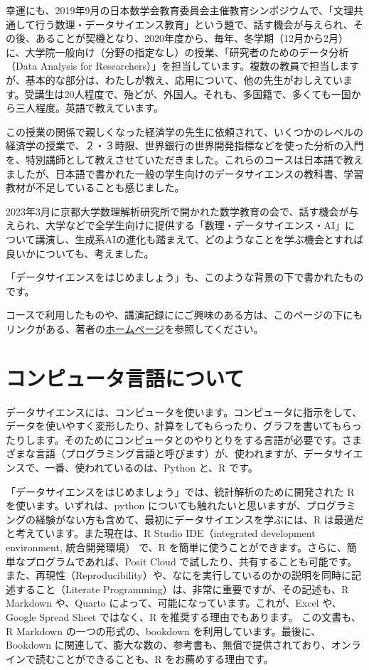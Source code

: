 \documentclass[
  xelatex, ja=standard]{bxjsbook}
\theoremstyle{definition}
\theoremstyle{definition}
\theoremstyle{definition}
\theoremstyle{definition}
\theoremstyle{remark}
\begin{document}
幸運にも、2019年9月の日本数学会教育委員会主催教育シンポジウムで、「文理共通して行う数理・データサイエンス教育」という題で、話す機会が与えられ、その後、あることが契機となり、2020年度から、毎年、冬学期（12月から2月）に、大学院一般向け（分野の指定なし）の授業、「研究者のためのデータ分析（Data Analysis for Researchers）」を担当しています。複数の教員で担当しますが、基本的な部分は、わたしが教え、応用について、他の先生がおしえています。受講生は20人程度で、殆どが、外国人。それも、多国籍で、多くても一国から三人程度。英語で教えています。

この授業の関係で親しくなった経済学の先生に依頼されて、いくつかのレベルの経済学の授業で、２・３時限、世界銀行の世界開発指標などを使った分析の入門を、特別講師として教えさせていただきました。これらのコースは日本語で教えましたが、日本語で書かれた一般の学生向けのデータサイエンスの教科書、学習教材が不足していることも感じました。

2023年3月に京都大学数理解析研究所で開かれた数学教育の会で、話す機会が与えられ、大学などで全学生向けに提供する「数理・データサイエンス・AI」について講演し、生成系AIの進化も踏まえて、どのようなことを学ぶ機会とすれば良いかについても、考えました。

「データサイエンスをはじめましょう」も、このような背景の下で書かれたものです。

コースで利用したものや、講演記録ににご興味のある方は、このページの下にもリンクがある、著者の\href{https://icu-hsuzuki.github.io/science/computer/learning/ds.html}{ホームページ}を参照してください。

\hypertarget{ux30b3ux30f3ux30d4ux30e5ux30fcux30bfux8a00ux8a9eux306bux3064ux3044ux3066}{%
\section*{コンピュータ言語について}\label{ux30b3ux30f3ux30d4ux30e5ux30fcux30bfux8a00ux8a9eux306bux3064ux3044ux3066}}

データサイエンスには、コンピュータを使います。コンピュータに指示をして、データを使いやすく変形したり、計算をしてもらったり、グラフを書いてもらったりします。そのためにコンピュータとのやりとりをする言語が必要です。さまざまな言語（プログラミング言語と呼びます）が、使われますが、データサイエンスで、一番、使われているのは、Python と、R です。

「データサイエンスをはじめましょう」では、統計解析のために開発された R を使います。いずれは、python についても触れたいと思いますが、プログラミングの経験がない方も含めて、最初にデータサイエンスを学ぶには、R は最適だと考えています。また現在は、R Studio IDE（integrated development environment, 統合開発環境） で、R を簡単に使うことができます。さらに、簡単なプログラムであれば、Posit Cloud で試したり、共有することも可能です。また、再現性（Reproducibility）や、なにを実行しているのかの説明を同時に記述すること（Literate Programming）は、非常に重要ですが、その記述も、R Markdown や、Quarto によって、可能になっています。これが、Excel や、Google Spread Sheet ではなく、R を推奨する理由でもあります。 この文書も、R Markdown の一つの形式の、bookdown を利用しています。最後に、Bookdown に関連して、膨大な数の、参考書も、無償で提供されており、オンラインで読むことができることも、R をお薦めする理由です。
\end{document}
